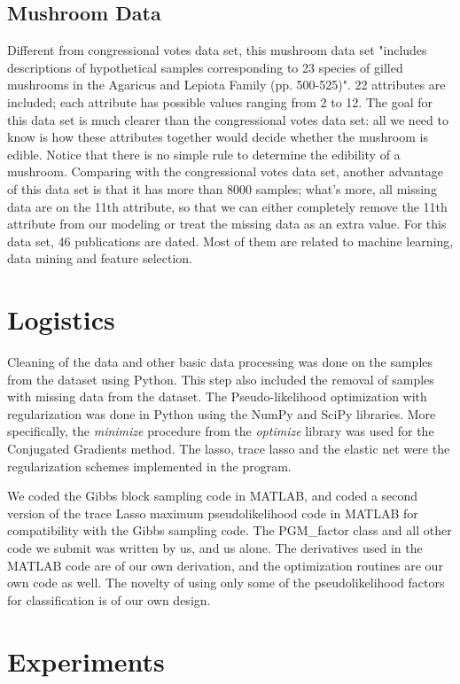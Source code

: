 \documentclass[11pt]{article}
\begin{document}
\subsection{Mushroom Data}

Different from congressional votes data set, this mushroom data set "includes descriptions of hypothetical samples corresponding to 23 species of gilled mushrooms in the Agaricus and Lepiota Family (pp. 500-525)". 22 attributes are included; each attribute has possible values ranging from 2 to 12. The goal for this data set is much clearer than the congressional votes data set: all we need to know is how these attributes together would decide whether the mushroom is edible. Notice that there is no simple rule to determine the edibility of a mushroom. Comparing with the congressional votes data set, another advantage of this data set is that it has more than 8000 samples; what's more, all missing data are on the 11th attribute, so that we can either completely remove the 11th attribute from our modeling or treat the missing data as an extra value. For this data set, 46 publications are dated. Most of them are related to machine learning, data mining and feature selection.

\section{Logistics}

Cleaning of the data and other basic data processing was done on the samples from the dataset using Python. This step also included the removal of samples with missing data from the dataset. 
The Pseudo-likelihood optimization with regularization was done in Python using the NumPy and SciPy libraries. 
More specifically, the \textit{minimize} procedure from the \textit{optimize} library was used for the Conjugated Gradients method. 
The lasso, trace lasso and the elastic net were the regularization schemes implemented in the program.

We coded the Gibbs block sampling code in MATLAB, and coded a second version of the trace Lasso maximum pseudolikelihood code in MATLAB for compatibility with the Gibbs sampling code. The PGM_factor class and all other code we submit was written by us, and us alone.  The derivatives used in the MATLAB code are of our own derivation, and the optimization routines are our own code as well. The novelty of using only some of the pseudolikelihood factors for classification is of our own design.

\section{Experiments}
\end{document}
